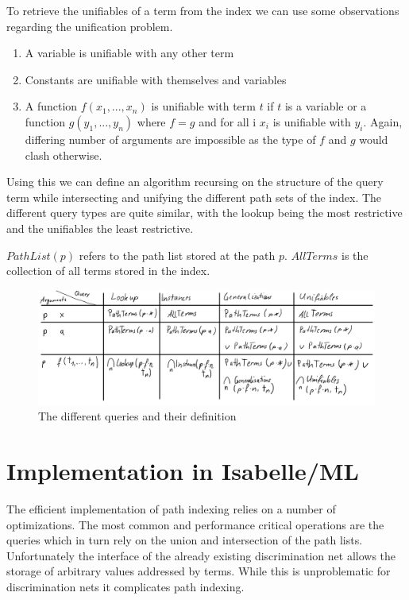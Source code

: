 To retrieve the unifiables of a term from the index we can use some observations regarding the unification problem.
\begin{enumerate}
  \item A variable is unifiable with any other term
  \item Constants are unifiable with themselves and variables
  \item A function $f(x_{1},...,x_{n})$ is unifiable with term $t$ if $t$ is a variable or a function $g(y_{1},...,y_{n})$ where $f = g$ and for all i $x_{i}$ is unifiable with $y_{i}$. Again, differing number of arguments are impossible as the type of $f$ and $g$ would clash otherwise.
\end{enumerate}
Using this we can define an algorithm recursing on the structure of the query term while intersecting and unifying the different path sets of the index. The different query types are quite similar, with the lookup being the most restrictive and the unifiables the least restrictive.

$PathList(p)$ refers to the path list stored at the path $p$. $AllTerms$ is the collection of all terms stored in the index.
\begin{figure}[h]
\centering
\includegraphics[scale=0.25]{figures/queries.png}
\caption{The different queries and their definition}
\end{figure}

\section{Implementation in Isabelle/ML}
The efficient implementation of path indexing relies on a number of optimizations. The most common and performance critical operations are the queries which in turn rely on the union and intersection of the path lists. Unfortunately the interface of the already existing discrimination net allows the storage of arbitrary values addressed by terms. While this is unproblematic for discrimination nets it complicates path indexing.

